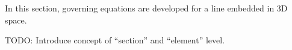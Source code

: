 
In this section, governing equations are developed for a line embedded in 3D space.

TODO: Introduce concept of ``section'' and ``element'' level.



